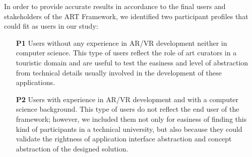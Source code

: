 In order to provide accurate results in accordance to the final users and stakeholders of the ART Framework, we identified two participant profiles that could fit as users in our study:
\begin{itemize}
    \item[\textbf{P1}] Users without any experience in \gls{AR}/\gls{VR} development neither in computer science. This type of users reflect the role of art curators in a touristic domain and are useful to test the easiness and level of abstraction from technical details usually involved in the development of these applications.
    \item[\textbf{P2}] Users with experience in \gls{AR}/\gls{VR} development and with a computer science background. This type of users do not reflect the end user of the framework; however, we included them not only for easiness of finding this kind of participants in a technical university, but also because they could validate the rightness of application interface abstraction and concept abstraction of the designed solution.
\end{itemize}




